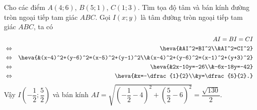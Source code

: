\begin{bt}%
	Cho các điểm $A(4;6)$, $B(5;1)$, $C(1;3)$. Tìm tọa độ tâm và bán kính đường tròn ngoại tiếp tam giác $ABC.$
	\loigiai
	{
		Gọi $I(x;y)$ là tâm đường tròn ngoại tiếp tam giác $ABC$, ta có
		\allowdisplaybreaks 
		\begin{eqnarray*}
			&&AI=BI=CI\\
			&\Leftrightarrow& \heva{&AI^2=BI^2\\&AI^2=CI^2}\\
			&\Leftrightarrow& \heva{&(x-4)^2+(y-6)^2=(x-5)^2+(y-1)^2\\&(x-4)^2+(y-6)^2=(x-1)^2+(y+3)^2}\\
			&\Leftrightarrow&\heva{&2x-10y=-26\\&-6x-18y=-42}\\
			&\Leftrightarrow&\heva{&x=-\dfrac{1}{2}\\&y=\dfrac{5}{2}.}
		\end{eqnarray*}
		Vậy $I\left(-\dfrac{1}{2};\dfrac{5}{2}\right)$ và bán kính $AI=\sqrt{\left(-\dfrac{1}{2}-4\right)^2+\left(\dfrac{5}{2}-6\right)^2}=\dfrac{\sqrt{130}}{2}$.
	}
\end{bt}

